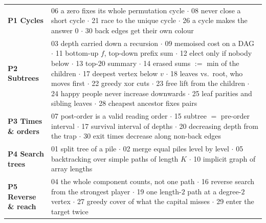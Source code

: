 \begin{tcolorbox}[enhanced, breakable, colback=white, colframe=accentorange, boxrule=1pt, arc=2mm,
    title={Topic index of the practice set --- one idea per problem}, fonttitle=\bfseries, colbacktitle=accentorange]
\small
\renewcommand{\arraystretch}{1.2}
\begin{tabularx}{\linewidth}{@{}>{\bfseries}l X@{}}
P1 Cycles & 06 a zero fixes its whole permutation cycle $\cdot$ 08 never close a short cycle $\cdot$ 21 race to the unique cycle $\cdot$ 26 a cycle makes the answer $0$ $\cdot$ 30 back edges get their own colour \\
P2 Subtrees & 03 depth carried down a recursion $\cdot$ 09 memoised cost on a DAG $\cdot$ 11 bottom-up $f$, top-down prefix sum $\cdot$ 12 elect only if nobody below $\cdot$ 13 top-$20$ summary $\cdot$ 14 erased sums $:=$ min of the children $\cdot$ 17 deepest vertex below $v$ $\cdot$ 18 leaves vs.\ root, who moves first $\cdot$ 22 greedy xor cuts $\cdot$ 23 free lift from the children $\cdot$ 24 happy people never increase downwards $\cdot$ 25 leaf parities and sibling leaves $\cdot$ 28 cheapest ancestor fixes pairs \\
P3 Times \& orders & 07 post-order is a valid reading order $\cdot$ 15 subtree $=$ pre-order interval $\cdot$ 17 survival interval of depths $\cdot$ 20 decreasing depth from the trap $\cdot$ 30 exit times decrease along non-back edges \\
P4 Search trees & 01 split tree of a pile $\cdot$ 02 merge equal piles level by level $\cdot$ 05 backtracking over simple paths of length $K$ $\cdot$ 10 implicit graph of array lengths \\
P5 Reverse \& reach & 04 the whole component counts, not one path $\cdot$ 16 reverse search from the strongest player $\cdot$ 19 one length-$2$ path at a degree-$2$ vertex $\cdot$ 27 greedy cover of what the capital misses $\cdot$ 29 enter the target twice \\
\end{tabularx}
\end{tcolorbox}
